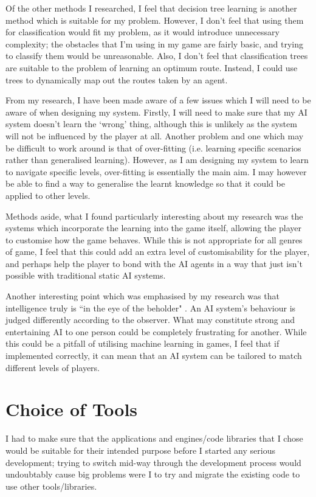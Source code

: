 \documentclass[a4paper,oneside]{report}
\begin{document}
Of the other methods I researched, I feel that decision tree learning is another method which is suitable for my problem. However, I don't feel that using them for classification would fit my problem, as it would introduce unnecessary complexity; the obstacles that I'm using in my game are fairly basic, and trying to classify them would be unreasonable. Also, I don't feel that classification trees are suitable to the problem of learning an optimum route. Instead, I could use trees to dynamically map out the routes taken by an agent.

From my research, I have been made aware of a few issues which I will need to be aware of when designing my system. Firstly, I will need to make sure that my AI system doesn't learn the `wrong' thing, although this is unlikely as the system will not be influenced by the player at all. Another problem and one which may be difficult to work around is that of over-fitting (i.e. learning specific scenarios rather than generalised learning). However, as I am designing my system to learn to navigate specific levels, over-fitting is essentially the main aim. I may however be able to find a way to generalise the learnt knowledge so that it could be applied to other levels. 

Methods aside, what I found particularly interesting about my research was the systems which incorporate the learning into the game itself, allowing the player to customise how the game behaves. While this is not appropriate for all genres of game, I feel that this could add an extra level of customisability for the player, and perhaps help the player to bond with the AI agents in a way that just isn't possible with traditional static AI systems.

Another interesting point which was emphasised by my research was that intelligence truly is ``in the eye of the beholder" \cite{:hc}. An AI system's behaviour is judged differently according to the observer. What may constitute strong and entertaining AI to one person could be completely frustrating for another. While this could be a pitfall of utilising machine learning in games, I feel that if implemented correctly, it can mean that an AI system can be tailored to match different levels of players.
	
\chapter{Choice of Tools}

I had to make sure that the applications and engines/code libraries that I chose would be suitable for their intended purpose before I started any serious development; trying to switch mid-way through the development process would undoubtably cause big problems were I to try and migrate the existing code to use other tools/libraries.
\end{document}
